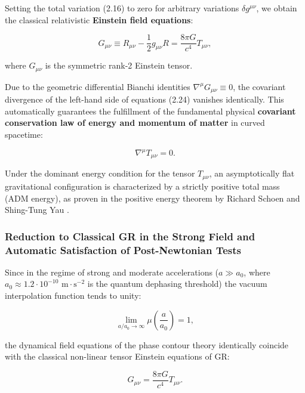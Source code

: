 \documentclass[11pt,a4paper]{article}
\theoremstyle{definition}
\begin{document}
Setting the total variation (2.16) to zero for arbitrary variations $\delta g^{\mu\nu}$, we obtain the classical relativistic \textbf{Einstein field equations}:

\begin{equation}\label{eq:2.24}\tag{2.24}
G_{\mu\nu} \equiv R_{\mu\nu} - \frac{1}{2} g_{\mu\nu} R = \frac{8\pi G}{c^4} T_{\mu\nu},
\end{equation}

where $G_{\mu\nu}$ is the symmetric rank-2 Einstein tensor.

Due to the geometric differential Bianchi identities $\nabla^\mu G_{\mu\nu} \equiv 0$, the covariant divergence of the left-hand side of equations (2.24) vanishes identically. This automatically guarantees the fulfillment of the fundamental physical \textbf{covariant conservation law of energy and momentum of matter} in curved spacetime:

\begin{equation}\label{eq:2.25}\tag{2.25}
\nabla^\mu T_{\mu\nu} = 0.
\end{equation}

Under the dominant energy condition for the tensor $T_{\mu\nu}$, an asymptotically flat gravitational configuration is characterized by a strictly positive total mass (ADM energy), as proven in the positive energy theorem by Richard Schoen and Shing-Tung Yau \cite{ref15}.

\subsubsection{Reduction to Classical GR in the Strong Field and Automatic Satisfaction of Post-Newtonian Tests}\label{sec:2.2.1}

Since in the regime of strong and moderate accelerations ($a \gg a_0$, where $a_0 \approx 1.2 \cdot 10^{-10}\text{ m}\cdot\text{s}^{-2}$ is the quantum dephasing threshold) the vacuum interpolation function tends to unity:

\begin{equation*}
\lim_{a/a_0 \to \infty} \mu\left(\frac{a}{a_0}\right) = 1,
\end{equation*}

the dynamical field equations of the phase contour theory identically coincide with the classical non-linear tensor Einstein equations of GR:

\begin{equation*}
G_{\mu\nu} = \frac{8\pi G}{c^4} T_{\mu\nu}.
\end{equation*}
\end{document}
